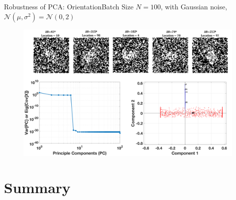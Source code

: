 \documentclass{beamer}
\begin{document}
\begin{frame}{Robustness of PCA: Orientation}{Batch Size $N = 100$, with Gaussian noise, $\mathcal{N}(\mu,\sigma^2)=\mathcal{N}(0,2)$}
  \begin{figure}
    \includegraphics[width=1\textheight]{Random_Orientation_Detection}
  \end{figure}
\end{frame}


\section*{Summary}
\end{document}
